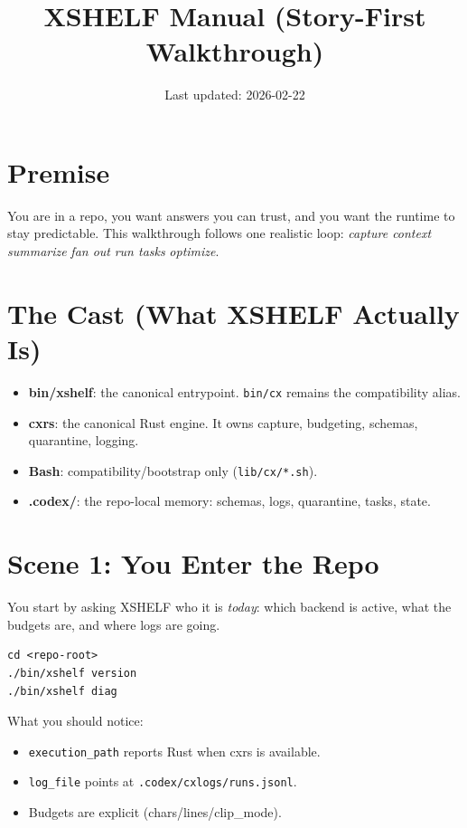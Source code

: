 \documentclass[11pt]{article}
\title{XSHELF Manual (Story-First Walkthrough)}
\author{}
\date{Last updated: 2026-02-22}
\begin{document}
\maketitle
\vspace{-0.6em}

\section*{Premise}
You are in a repo, you want answers you can trust, and you want the runtime to stay predictable.
This walkthrough follows one realistic loop: \emph{capture context} \textrightarrow{} \emph{summarize}
\textrightarrow{} \emph{fan out} \textrightarrow{} \emph{run tasks} \textrightarrow{} \emph{optimize}.

\section{The Cast (What XSHELF Actually Is)}
\begin{itemize}
  \item \textbf{bin/xshelf}: the canonical entrypoint. \texttt{bin/cx} remains the compatibility alias.
  \item \textbf{cxrs}: the canonical Rust engine. It owns capture, budgeting, schemas, quarantine, logging.
  \item \textbf{Bash}: compatibility/bootstrap only (\texttt{lib/cx/*.sh}).
  \item \textbf{.codex/}: the repo-local memory: schemas, logs, quarantine, tasks, state.
\end{itemize}

\section{Scene 1: You Enter the Repo}
You start by asking XSHELF who it is \emph{today}: which backend is active, what the budgets are, and
where logs are going.

\begin{lstlisting}[style=cx]
cd <repo-root>
./bin/xshelf version
./bin/xshelf diag
\end{lstlisting}

What you should notice:
\begin{itemize}
  \item \texttt{execution\_path} reports Rust when cxrs is available.
  \item \texttt{log\_file} points at \texttt{.codex/cxlogs/runs.jsonl}.
  \item Budgets are explicit (chars/lines/clip\_mode).
\end{itemize}
\end{document}
